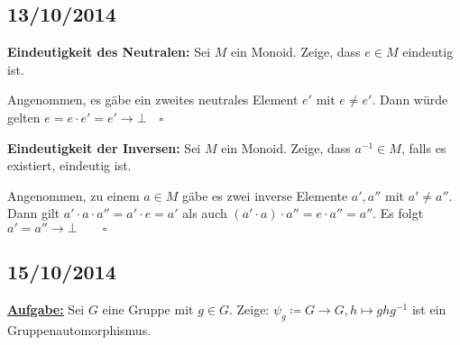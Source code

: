 \documentclass[10pt,a4paper]{article}
\begin{document}
\subsection{13/10/2014}

\textbf{Eindeutigkeit des Neutralen:} Sei $M$ ein Monoid. Zeige, dass $e \in M$ eindeutig ist.\bigskip

Angenommen, es gäbe ein zweites neutrales Element $e'$ mit $e \neq e'$. Dann würde gelten $e = e \cdot e' = e' \rightarrow \bot \quad \square$\bigskip

\textbf{Eindeutigkeit der Inversen:} Sei $M$ ein Monoid. Zeige, dass $a^{-1} \in M$, falls es existiert, eindeutig ist.\bigskip

Angenommen, zu einem $a \in M$ gäbe es zwei inverse Elemente $a', a''$ mit $a' \neq a''$. Dann gilt $a' \cdot a \cdot a''= a' \cdot e = a'$ als auch $(a' \cdot a) \cdot a'' = e \cdot a'' = a''$. Es folgt $a' = a'' \rightarrow \bot \qquad \square$

\subsection{15/10/2014}

\textbf{\underline{Aufgabe:}} Sei $G$ eine Gruppe mit $g \in G$. Zeige: $\psi_g \coloneqq G \to G, h \mapsto g h g^{-1}$ ist ein Gruppenautomorphismus.
\end{document}
